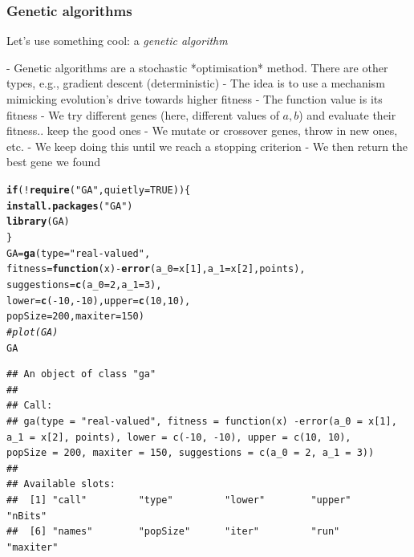 \documentclass[aspectratio=169]{beamer}\usepackage[]{graphicx}\usepackage[]{xcolor}
\makeatletter
\newcommand{\hlnum}[1]{\textcolor[rgb]{0.686,0.059,0.569}{#1}}%
\newcommand{\hlstr}[1]{\textcolor[rgb]{0.192,0.494,0.8}{#1}}%
\newcommand{\hlcom}[1]{\textcolor[rgb]{0.678,0.584,0.686}{\textit{#1}}}%
\newcommand{\hlopt}[1]{\textcolor[rgb]{0,0,0}{#1}}%
\newcommand{\hlstd}[1]{\textcolor[rgb]{0.345,0.345,0.345}{#1}}%
\newcommand{\hlkwa}[1]{\textcolor[rgb]{0.161,0.373,0.58}{\textbf{#1}}}%
\newcommand{\hlkwb}[1]{\textcolor[rgb]{0.69,0.353,0.396}{#1}}%
\newcommand{\hlkwc}[1]{\textcolor[rgb]{0.333,0.667,0.333}{#1}}%
\newcommand{\hlkwd}[1]{\textcolor[rgb]{0.737,0.353,0.396}{\textbf{#1}}}%
\newenvironment{kframe}{%
 \def\at@end@of@kframe{}%
 \ifinner\ifhmode%
  \def\at@end@of@kframe{\end{minipage}}%
  \begin{minipage}{\columnwidth}%
 \fi\fi%
 \def\FrameCommand##1{\hskip\@totalleftmargin \hskip-\fboxsep
 \colorbox{shadecolor}{##1}\hskip-\fboxsep
     \hskip-\linewidth \hskip-\@totalleftmargin \hskip\columnwidth}%
 \MakeFramed {\advance\hsize-\width
   \@totalleftmargin\z@ \linewidth\hsize
   \@setminipage}}%
 {\par\unskip\endMakeFramed%
 \at@end@of@kframe}
\newenvironment{knitrout}{}{} %
\makeatother
\begin{document}
\begin{frame}\frametitle{Genetic algorithms}
Let's use something cool: a \emph{genetic algorithm}

- Genetic algorithms are a stochastic *optimisation* method. There are other types, e.g., gradient descent (deterministic)
- The idea is to use a mechanism mimicking evolution's drive towards higher fitness
- The function value is its fitness
- We try different genes (here, different values of $a,b$) and evaluate their fitness.. keep the good ones
- We mutate or crossover genes, throw in new ones, etc.
- We keep doing this until we reach a stopping criterion
- We then return the best gene we found
\end{frame}


\begin{frame}[fragile]
\begin{knitrout}
\color{fgcolor}\begin{kframe}
\begin{alltt}
\hlkwa{if} \hlstd{(}\hlopt{!}\hlkwd{require}\hlstd{(}\hlstr{"GA"}\hlstd{,} \hlkwc{quietly} \hlstd{=} \hlnum{TRUE}\hlstd{)) \{}
  \hlkwd{install.packages}\hlstd{(}\hlstr{"GA"}\hlstd{)}
  \hlkwd{library}\hlstd{(GA)}
\hlstd{\}}
\hlstd{GA} \hlkwb{=} \hlkwd{ga}\hlstd{(}\hlkwc{type} \hlstd{=} \hlstr{"real-valued"}\hlstd{,}
        \hlkwc{fitness} \hlstd{=} \hlkwa{function}\hlstd{(}\hlkwc{x}\hlstd{)} \hlopt{-}\hlkwd{error}\hlstd{(}\hlkwc{a_0} \hlstd{= x[}\hlnum{1}\hlstd{],} \hlkwc{a_1} \hlstd{= x[}\hlnum{2}\hlstd{], points),}
        \hlkwc{suggestions} \hlstd{=} \hlkwd{c}\hlstd{(}\hlkwc{a_0} \hlstd{=} \hlnum{2}\hlstd{,} \hlkwc{a_1} \hlstd{=} \hlnum{3}\hlstd{),}
        \hlkwc{lower} \hlstd{=} \hlkwd{c}\hlstd{(}\hlopt{-}\hlnum{10}\hlstd{,} \hlopt{-}\hlnum{10}\hlstd{),} \hlkwc{upper} \hlstd{=} \hlkwd{c}\hlstd{(}\hlnum{10}\hlstd{,} \hlnum{10}\hlstd{),}
        \hlkwc{popSize} \hlstd{=} \hlnum{200}\hlstd{,} \hlkwc{maxiter} \hlstd{=} \hlnum{150}\hlstd{)}
\hlcom{# plot(GA)}
\hlstd{GA}
\end{alltt}
\begin{verbatim}
## An object of class "ga"
## 
## Call:
## ga(type = "real-valued", fitness = function(x) -error(a_0 = x[1],     a_1 = x[2], points), lower = c(-10, -10), upper = c(10, 10),     popSize = 200, maxiter = 150, suggestions = c(a_0 = 2, a_1 = 3))
## 
## Available slots:
##  [1] "call"         "type"         "lower"        "upper"        "nBits"       
##  [6] "names"        "popSize"      "iter"         "run"          "maxiter"     

\end{verbatim}
\end{kframe}
\end{knitrout}
\end{frame}
\end{document}
